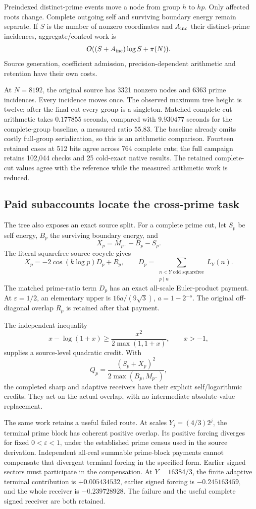 Preindexed distinct-prime events move a node from group \(h\) to
\(hp\). Only affected roots change. Complete outgoing self and
surviving boundary energy remain separate. If \(S\) is the number of
nonzero coordinates and \(A_{\rm inc}\) their distinct-prime incidences,
aggregate/control work is
\[
 O((S+A_{\rm inc})\log S+\pi(N)).
\]
Source generation, coefficient admission, precision-dependent
arithmetic and retention have their own costs.

At \(N=8192\), the original source has 3321 nonzero nodes and 6363
prime incidences. Every incidence moves once. The observed maximum
tree height is twelve; after the final cut every group is a singleton.
Matched complete-cut arithmetic takes \(0.177855\) seconds, compared
with \(9.930477\) seconds for the complete-group baseline, a measured
ratio \(55.83\). The baseline already omits costly full-group
serialization, so this is an arithmetic comparison. Fourteen
retained cases at 512 bits agree across 764 complete cuts; the full
campaign retains 102,044 checks and 25 cold-exact native results.
The retained complete-cut values agree with the reference while the measured arithmetic work is reduced.

\subsection{Paid subaccounts locate the cross-prime task}

The tree also exposes an exact source split. For a complete prime
cut, let \(S_p\) be self energy, \(B_p\) the surviving boundary
energy, and
\[
 X_p=M_{p^-}-B_p-S_p.
\]
The literal squarefree source cocycle gives
\[
 X_p=-2\cos(k\log p)D_p+R_p,\qquad
 D_p=\sum_{\substack{n<Y\text{ odd squarefree}\\p\mid n}}L_Y(n).
\]
The matched prime-ratio term \(D_p\) has an exact all-scale Euler-product
payment. At \(\varepsilon=1/2\), an elementary upper is
\(16a/(9\sqrt3)\), \(a=1-2^{-s}\). The original off-diagonal overlap
\(R_p\) is retained after that payment.

The independent inequality
\[
 x-\log(1+x)\geq
 \frac{x^2}{2\max(1,1+x)},\qquad x>-1,
\]
supplies a source-level quadratic credit. With
\[
 Q_p=\frac{(S_p+X_p)^2}
                 {2\max(B_p,M_{p^-})},
\]
the completed sharp and adaptive receivers have their explicit
self/logarithmic credits. They act on the actual overlap, with no
intermediate absolute-value replacement.

The same work retains a useful failed route. At scales
\(Y_j=(4/3)2^j\), the terminal prime block has coherent positive
overlap. Its positive forcing diverges for fixed
\(0<\varepsilon<1\), under the established prime census used in the
source derivation. Independent all-real summable prime-block payments cannot compensate that divergent terminal forcing in the specified form. Earlier signed sectors must participate in the compensation. At \(Y=16384/3\), the finite
adaptive terminal contribution is \(+0.005434532\), earlier signed
forcing is \(-0.245163459\), and the whole receiver is
\(-0.239728928\). The failure and the useful complete signed receiver
are both retained.

